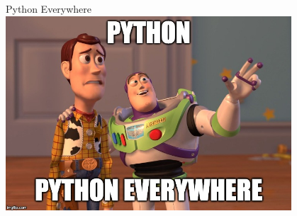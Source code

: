     \begin{frame}{Python Everywhere}
		\centering
		\includegraphics[width=0.8\textwidth]{images/python_everywhere.jpg}
	\end{frame}


